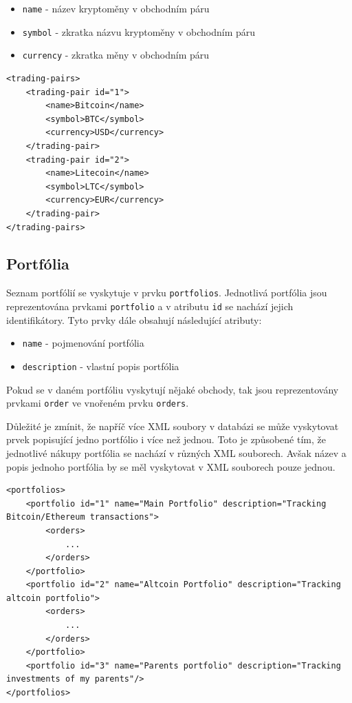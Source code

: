 \documentclass[12pt, a4paper]{article}
\begin{document}
\begin{itemize}
    \item \texttt{name} - název kryptoměny v obchodním páru
    \item \texttt{symbol} - zkratka názvu kryptoměny v obchodním páru 
    \item \texttt{currency} - zkratka měny v obchodním páru 
\end{itemize}


\begin{lstlisting}
<trading-pairs>
    <trading-pair id="1">
        <name>Bitcoin</name>
        <symbol>BTC</symbol>
        <currency>USD</currency>
    </trading-pair>
    <trading-pair id="2">
        <name>Litecoin</name>
        <symbol>LTC</symbol>
        <currency>EUR</currency>
    </trading-pair>
</trading-pairs>
\end{lstlisting}

\subsection{Portfólia}
Seznam portfólií se vyskytuje v prvku \texttt{portfolios}. Jednotlivá portfólia jsou reprezentována prvkami \texttt{portfolio} a v atributu \texttt{id} se nachází jejich identifikátory. Tyto prvky dále obsahují následující atributy:

\begin{itemize}
    \item \texttt{name} - pojmenování portfólia
    \item \texttt{description} - vlastní popis portfólia
\end{itemize}

Pokud se v daném portfóliu vyskytují nějaké obchody, tak jsou reprezentovány prvkami \texttt{order} ve vnořeném prvku \texttt{orders}.

Důležité je zmínit, že napříč více XML soubory v databázi se může vyskytovat prvek popisující jedno portfólio i více než jednou. Toto je způsobené tím, že jednotlivé nákupy portfólia se nachází v různých XML souborech. Avšak název a popis jednoho portfólia by se měl vyskytovat v XML souborech pouze jednou.

\begin{lstlisting}
<portfolios>
    <portfolio id="1" name="Main Portfolio" description="Tracking Bitcoin/Ethereum transactions">
        <orders>
            ...
        </orders>
    </portfolio>
    <portfolio id="2" name="Altcoin Portfolio" description="Tracking altcoin portfolio">
        <orders>
            ...
        </orders>
    </portfolio>
    <portfolio id="3" name="Parents portfolio" description="Tracking investments of my parents"/>
</portfolios>

\end{lstlisting}
\end{document}
